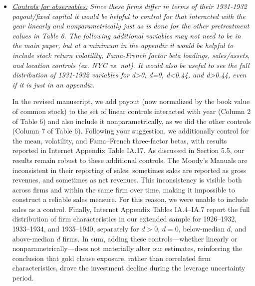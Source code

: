 \begin{itemize}
    \item[\textit{\textcolor{red!60!black}{a.}}] \textit{\textcolor{red!60!black}{
    \underline{Controls for observables:} 
    Since these firms differ in terms of their 1931-1932 payout/fixed capital it would be helpful to control for that interacted with the year linearly and nonparametrically just as is done for the other pretreatment values in Table 6. The following additional variables may not need to be in the main paper, but at a minimum in the appendix it would be helpful to include stock return volatility, Fama-French factor beta loadings, sales/assets, and location controls (ex. NYC vs. not). It would also be useful to see the full distribution of 1931-1932 variables for d>0, d=0, d<0.44, and d>0.44, even if it is just in an appendix.
    }}

    \bigskip

    \noindent In the revised manuscript, we add payout (now normalized by the book value of common stock) to the set of linear controls interacted with year (Column 2 of Table 6) and also include it nonparametrically, as we did the other controls (Column 7 of Table 6). Following your suggestion, we additionally control for the mean, volatility, and Fama–French three-factor betas, with results reported in Internet Appendix Table IA.17. As discussed in Section 5.5, our results remain robust to these additional controls. The Moody's Manuals are inconsistent in their reporting of sales: sometimes sales are reported as gross revenues, and sometimes as net revenues. This inconsistency is visible both across firms and within the same firm over time, making it impossible to construct a reliable sales measure. For this reason, we were unable to include sales as a control. Finally, Internet Appendix Tables IA.4–IA.7 report the full distribution of firm characteristics in our extended sample for 1926–1932, 1933–1934, and 1935–1940, separately for $d>0$, $d=0$, below-median $d$, and above-median $d$ firms. In sum, adding these controls---whether linearly or nonparametrically---does not materially alter our estimates, reinforcing the conclusion that gold clause exposure, rather than correlated firm characteristics, drove the investment decline during the leverage uncertainty period.
    

\end{itemize}
